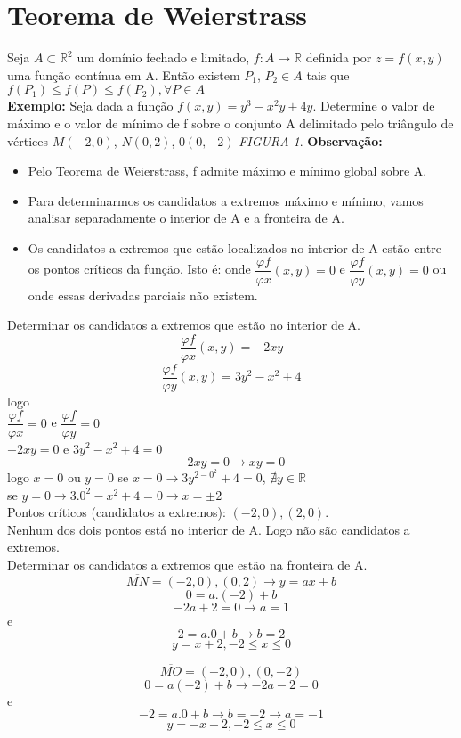 \documentclass{article}
\begin{document}
	\section{Teorema de Weierstrass} 
		Seja $A \subset \mathbb{R}^2$ um domínio fechado e limitado, $f:A \to \mathbb{R}$ definida por $z=f(x,y)$ uma função contínua em A. Então existem $P_1$, $P_2 \in A$ tais que $f(P_1) \leq f(P) \leq f(P_2), \forall P \in A$\\
		\textbf{Exemplo:} Seja dada a função $f(x,y)=y^3-x^2y+4y$. Determine o valor de máximo e o valor de mínimo de f sobre o conjunto A delimitado pelo triângulo de vértices $M(-2,0)$, $N(0,2)$, $0(0,-2)$  \textit{FIGURA 1}.
		\textbf{Observação:}
		\begin{itemize}
			\item Pelo Teorema de Weierstrass, f admite máximo e mínimo global sobre A.
			\item Para determinarmos os candidatos a extremos máximo e mínimo, vamos analisar separadamente o interior de A e a fronteira de A.
			\item Os candidatos a extremos que estão localizados no interior de A estão entre os pontos críticos da função. Isto é: onde $\dfrac{\varphi f}{\varphi x}(x,y)=0$ e $\dfrac{\varphi f}{\varphi y}(x,y)=0$ ou onde essas derivadas parciais não existem.
		\end{itemize}
		Determinar os candidatos a extremos que estão no interior de A.
		$$\dfrac{\varphi f}{\varphi x}(x,y)=-2xy$$
		$$\dfrac{\varphi f}{\varphi y}(x,y)= 3y^2-x^2+4$$
		logo\\
		$\dfrac{\varphi f}{\varphi x}=0$ e $\dfrac{\varphi f}{\varphi y}= 0$\\
		$-2xy=0$ e $3y^2 -x^2+4=0$\\
		$$-2xy=0 \to xy=0 $$
		logo $ x=0$ ou $y=0$
		se $x=0 \to 3y^{2-0^2}+4=0$, $\nexists y \in \mathbb{R}$\\
		se $y=0 \to 3.0^2-x^2+4=0\to x= \pm 2$\\%
		Pontos críticos (candidatos a extremos): $(-2,0),(2,0)$.\\
		Nenhum dos dois pontos está no interior de A. Logo não são candidatos a extremos.\\
		Determinar os candidatos a extremos que estão na fronteira de A.
		$$\overline{MN} = (-2,0),(0,2) \to y = ax+b$$
		$$0 = a.(-2) +b$$
		$$-2a+2=0\to a = 1$$
		e
		$$2=a.0+b \to b=2$$
		$$y=x+2, -2\leq x \leq 0$$
		
		$$\overline{MO}=(-2,0),(0,-2)$$
		$$0=a(-2)+b \to -2a - 2 = 0 $$
		e
		$$-2 = a.0+b \to b = -2 \to a = -1$$
		$$y = -x-2, -2\leq x \leq 0$$
		
\end{document}
